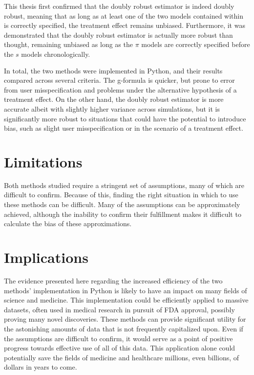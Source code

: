 This thesis first confirmed that the doubly robust estimator is indeed doubly robust, meaning that as long as at least one of the two models contained within is correctly specified, the treatment effect remains unbiased.  Furthermore, it was demonstrated that the doubly robust estimator is actually more robust than thought, remaining unbiased as long as the $\pi$ models are correctly specified before the $s$ models chronologically.  

In total, the two methods were implemented in Python, and their results compared across several criteria.  The g-formula is quicker, but prone to error from user misspecification and problems under the alternative hypothesis of a treatment effect.  On the other hand, the doubly robust estimator is more accurate albeit with slightly higher variance across simulations, but it is significantly more robust to situations that could have the potential to introduce bias, such as slight user misspecification or in the scenario of a treatment effect.  

\section{Limitations}
Both methods studied require a stringent set of assumptions, many of which are difficult to confirm.  Because of this, finding the right situation in which to use these methods can be difficult.  Many of the assumptions can be approximately achieved, although the inability to confirm their fulfillment makes it difficult to calculate the bias of these approximations.  

\section{Implications}
The evidence presented here regarding the increased efficiency of the two methods' implementation in Python is likely to have an impact on many fields of science and medicine.  This implementation could be efficiently applied to massive datasets, often used in medical research in pursuit of FDA approval, possibly proving many novel discoveries.  These methods can provide significant utility for the astonishing amounts of data that is not frequently capitalized upon.  Even if the assumptions are difficult to confirm, it would serve as a point of positive progress towards effective use of all of this data.  This application alone could potentially save the fields of medicine and healthcare millions, even billions, of dollars in years to come. 

